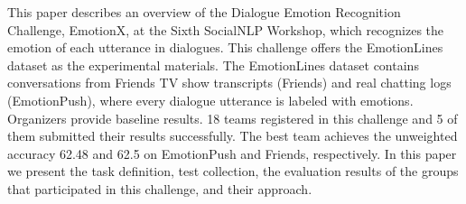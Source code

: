 This paper describes an overview of the Dialogue Emotion Recognition Challenge, EmotionX, at the Sixth SocialNLP Workshop, which recognizes the emotion of each utterance in dialogues. This challenge offers the EmotionLines dataset as the experimental materials. The EmotionLines dataset contains conversations from Friends TV show transcripts (Friends) and real chatting logs (EmotionPush), where every dialogue utterance is labeled with emotions. Organizers provide baseline results. 18 teams registered in this challenge and 5 of them submitted their results successfully. The best team achieves the unweighted accuracy 62.48 and 62.5 on EmotionPush and Friends, respectively. In this paper we present the task definition, test collection, the evaluation results of the groups that participated in this challenge, and their approach.
